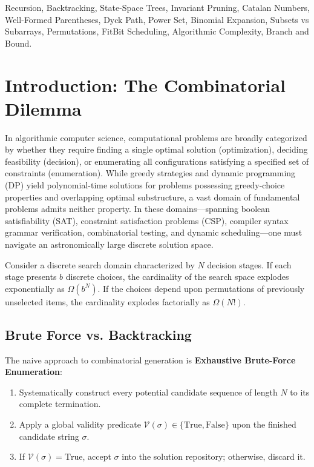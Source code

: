 \documentclass[10pt,journal,compsoc,onecolumn]{IEEEtran}
\begin{document}
{\begin{IEEEkeywords}
Recursion, Backtracking, State-Space Trees, Invariant Pruning, Catalan Numbers, Well-Formed Parentheses, Dyck Path, Power Set, Binomial Expansion, Subsets vs Subarrays, Permutations, FitBit Scheduling, Algorithmic Complexity, Branch and Bound.
\end{IEEEkeywords}
}

\maketitle
\IEEEdisplaynontitleabstractindextext
\IEEEpeerreviewmaketitle

\section{Introduction: The Combinatorial Dilemma}
\label{sec:intro}

In algorithmic computer science, computational problems are broadly categorized by whether they require finding a single optimal solution (optimization), deciding feasibility (decision), or enumerating all configurations satisfying a specified set of constraints (enumeration). While greedy strategies and dynamic programming (DP) yield polynomial-time solutions for problems possessing greedy-choice properties and overlapping optimal substructure, a vast domain of fundamental problems admits neither property. In these domains—spanning boolean satisfiability (SAT), constraint satisfaction problems (CSP), compiler syntax grammar verification, combinatorial testing, and dynamic scheduling—one must navigate an astronomically large discrete solution space.

Consider a discrete search domain characterized by $N$ decision stages. If each stage presents $b$ discrete choices, the cardinality of the search space explodes exponentially as $\Omega(b^N)$. If the choices depend upon permutations of previously unselected items, the cardinality explodes factorially as $\Omega(N!)$. 

\subsection{Brute Force vs. Backtracking}
The naive approach to combinatorial generation is \textbf{Exhaustive Brute-Force Enumeration}:
\begin{enumerate}
    \item Systematically construct every potential candidate sequence of length $N$ to its complete termination.
    \item Apply a global validity predicate $\mathcal{V}(\sigma) \in \{\text{True}, \text{False}\}$ upon the finished candidate string $\sigma$.
    \item If $\mathcal{V}(\sigma) = \text{True}$, accept $\sigma$ into the solution repository; otherwise, discard it.
\end{enumerate}
\end{document}
